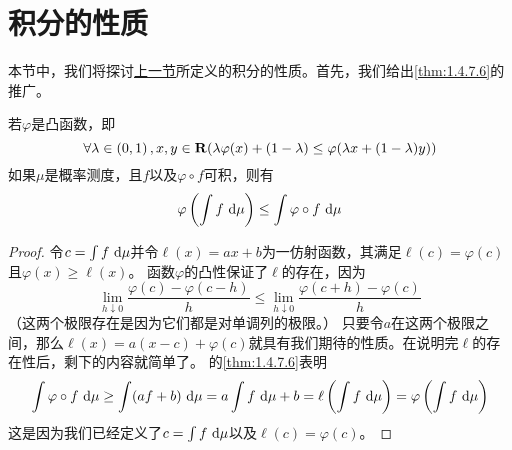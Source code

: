 \documentclass[../main.tex]{subfiles}
\begin{document}
\section{积分的性质} \label{sec:1.5}
本节中，我们将探讨\hyperref[sec:1.4]{上一节}所定义的积分的性质。首先，我们给出\ref{thm:1.4.7.6}的推广。
\begin{theorem}
	\label{thm:1.5.1}
	若\(\varphi\)是凸函数，即
	\[\forall\lambda\in\intoo{0,1},x,y\in\R (\lambda\varphi(x)+(1-\lambda)\leq\varphi(\lambda x+(1-\lambda)y))\]
	如果\(\mu\)是概率测度，且\(f\)以及\(\varphi\circ f\)可积，则有
	\[\varphi\del{\int f\,\dif\mu}\leq \int\varphi\circ f\,\dif\mu\]
\end{theorem}
\begin{proof}
	令\(c=\int f\,\dif\mu\)并令\(\ell(x)=ax+b\)为一仿射函数，其满足\(\ell(c)=\varphi(c)\)且\(\varphi(x)\geq\ell(x)\)。
	函数\(\varphi\)的凸性保证了\(\ell\)的存在，因为
	\[\lim\limits_{h\downarrow0}\frac{\varphi(c)-\varphi(c-h)}{h}\leq\lim\limits_{h\downarrow0}\frac{\varphi(c+h)-\varphi(c)}{h}\]
	（这两个极限存在是因为它们都是对单调列的极限。）
	只要令\(a\)在这两个极限之间，那么\(\ell(x)=a(x-c)+\varphi(c)\)就具有我们期待的性质。在说明完\(\ell\)的存在性后，剩下的内容就简单了。
	的\ref{thm:1.4.7.6}表明
	\[\int\varphi\circ f\,\dif\mu\geq\int(af+b)\,\dif\mu=a\int f\,\dif\mu+b=\ell\del{\int f\,\dif\mu}=\varphi\del{\int f\,\dif\mu}\]
	这是因为我们已经定义了\(c=\int f\,\dif\mu\)以及\(\ell(c)=\varphi(c)\)。
\end{proof}
\end{document}
